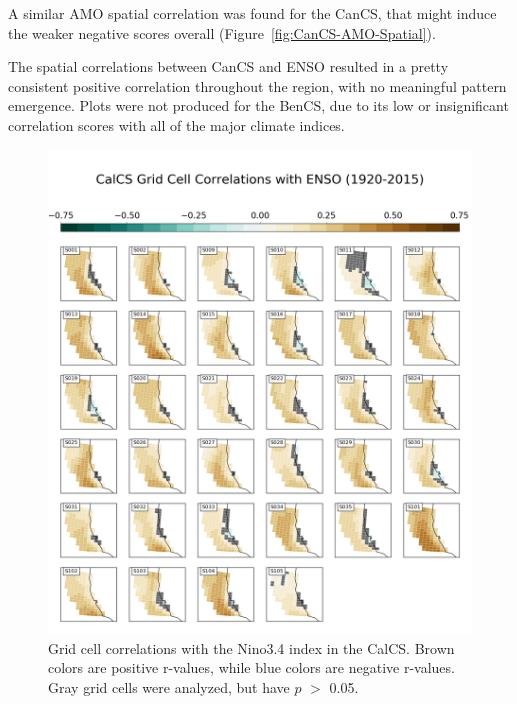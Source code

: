 \documentclass[12pt]{article}
\begin{document}
A similar AMO spatial correlation was found for the CanCS, that might induce the weaker negative scores overall (Figure~\ref{fig:CanCS-AMO-Spatial}).

The spatial correlations between CanCS and ENSO resulted in a pretty consistent positive correlation throughout the region, with no meaningful pattern emergence. Plots were not produced for the BenCS, due to its low or insignificant correlation scores with all of the major climate indices.

\newpage
\begin{figure}[!h]
	\centering
	\includegraphics[width=\linewidth]{../../figs/calcs/spatial-correlations/calcs-grid-cell-correlations-nino34-postage.png}
	\caption{Grid cell correlations with the Nino3.4 index in the CalCS. Brown colors are positive r-values, while blue colors are negative r-values. Gray grid cells were analyzed, but have $p$ $>$ 0.05.}
	\label{fig:CalCS-ENSO-Spatial}
\end{figure}
\newpage
\end{document}
